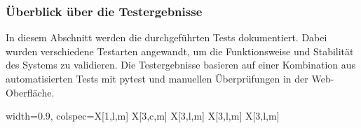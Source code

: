 \subsubsection{Überblick über die Testergebnisse}


\footnotesize


In diesem Abschnitt werden die durchgeführten Tests dokumentiert. Dabei wurden verschiedene Testarten angewandt, um die Funktionsweise und Stabilität des Systems zu validieren. 
Die Testergebnisse basieren auf einer Kombination aus automatisierten Tests mit pytest und manuellen Überprüfungen in der Web-Oberfläche.\par

\begin{center}
	\begin{talltblr}[caption={Testfälle für die Hausverwaltungssoftware}, label={tab:testcases}]{width=0.9\textwidth, colspec={X[1,l,m] X[3,c,m] X[3,l,m] X[3,l,m] X[3,l,m]}}\toprule


\end{talltblr}
\end{center}
